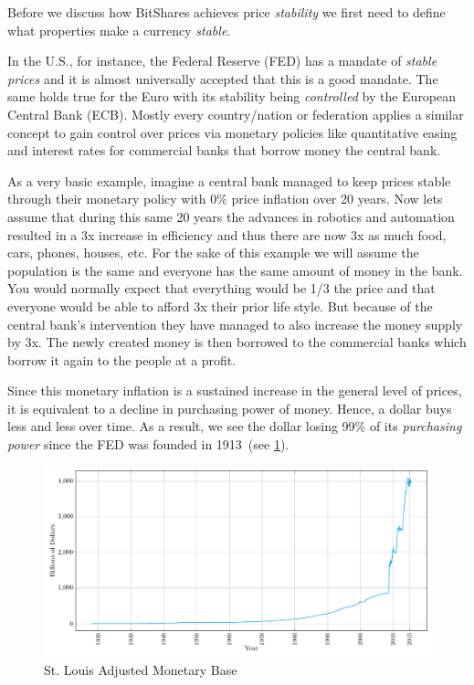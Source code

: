 Before we discuss how BitShares achieves price \emph{stability} we first need to
define what properties make a currency \emph{stable}.

In the U.S., for instance, the Federal Reserve (FED) has a mandate of
\emph{stable prices} and it is almost universally accepted that this is a good
mandate. The same holds true for the Euro with its stability being
\emph{controlled} by the European Central Bank (ECB). Mostly every
country/nation or federation applies a similar concept to gain control over
prices via monetary policies like quantitative easing and interest rates for
commercial banks that borrow money the central bank.

As a very basic example, imagine a central bank managed to keep prices stable
through their monetary policy with 0\% price inflation over 20 years. Now lets
assume that during this same 20 years the advances in robotics and automation
resulted in a 3x increase in efficiency and thus there are now 3x as much food,
cars, phones, houses, etc. For the sake of this example we will assume the
population is the same and everyone has the same amount of money in the bank.
You would normally expect that everything would be 1/3 the price and that
everyone would be able to afford 3x their prior life style. But because of the
central bank's intervention they have managed to also increase the money supply
by 3x. The newly created money is then borrowed to the commercial banks which
borrow it again to the people at a profit.

Since this monetary inflation is a sustained increase in the general level of
prices, it is equivalent to a decline in purchasing power of money.  Hence, a
dollar buys less and less over time. As a result, we see the dollar losing 99\%
of its \emph{purchasing power} since the FED was founded in 1913~(see
\cref{fig:monetarybase}). 

\begin{figure}[!htp]
 \centering
 \includegraphics[width=\linewidth]{figures/monetary-base}
 \caption{St. Louis Adjusted Monetary Base~\cite{ambsl}}
 \label{fig:monetarybase}
\end{figure}

